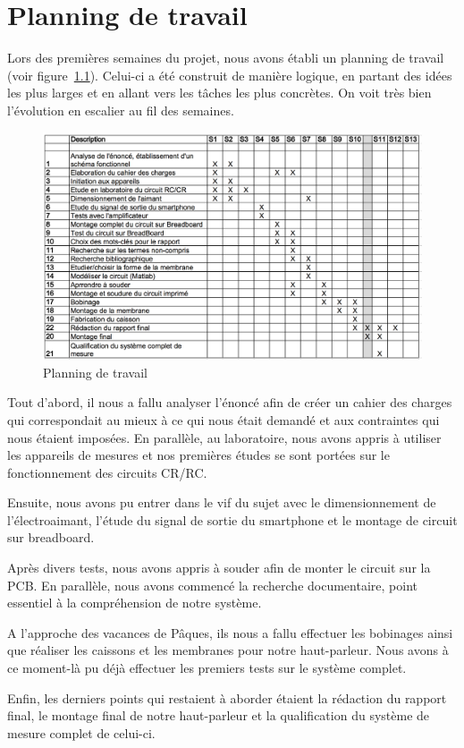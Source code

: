 \chapter{Planning de travail}
\label{annexe:planning}

Lors des premières semaines du projet, nous avons établi un planning de travail (voir figure~\ref{fig:plan}). Celui-ci a été construit de manière logique, en partant des idées les plus larges et en allant vers les tâches les plus concrètes. On voit très bien l'évolution en escalier au fil des semaines.

\begin{figure}	
\begin{center}
\includegraphics[width=\textwidth]{img/planning} 
\end{center}
\caption{Planning de travail}		
\label{fig:plan}		
\end{figure}

Tout d'abord, il nous a fallu analyser l'énoncé afin de créer un cahier des charges qui correspondait au mieux à ce qui nous était demandé et aux contraintes qui nous étaient imposées. 
En parallèle, au laboratoire, nous avons appris à utiliser les appareils de mesures et nos premières études se sont portées sur le fonctionnement des circuits CR/RC.

Ensuite, nous avons pu entrer dans le vif du sujet avec le dimensionnement de l'électroaimant, l'étude du signal de sortie du smartphone et le montage de circuit sur breadboard.

Après divers tests, nous avons appris à souder afin de monter le circuit sur la PCB. En parallèle, nous avons commencé la recherche documentaire, point essentiel à la compréhension de notre système.

A l'approche des vacances de Pâques, ils nous a fallu effectuer les bobinages ainsi que réaliser les caissons et les membranes pour notre haut-parleur. Nous avons à ce moment-là pu déjà effectuer les premiers tests sur le système complet.

Enfin, les derniers points qui restaient à aborder étaient la rédaction du rapport final, le montage final de notre haut-parleur et la qualification du système de mesure complet de celui-ci.

